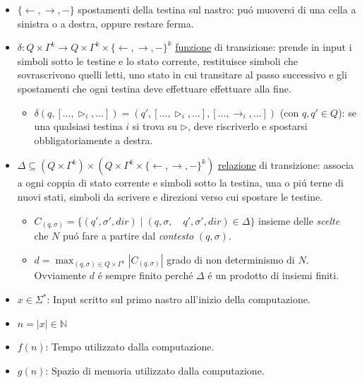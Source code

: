 \begin{itemize}
    \item $\{\leftarrow, \rightarrow, -\}$ spostamenti della testina sul nastro: puó muoversi di una cella a sinistra o a destra, oppure restare ferma.
    \item $\delta: Q \times \Gamma^k \rightarrow Q \times \Gamma^k \times \{\leftarrow, \rightarrow, -\}^k$ \underline{funzione} di transizione: prende in input i simboli sotto le testine e lo stato corrente, restituisce simboli che sovrascrivono quelli letti, uno stato in cui transitare al passo successivo e gli spostamenti che ogni testina deve effettuare effettuare alla fine.
    \begin{itemize}
        \item $\delta(q, [\dots, \triangleright_i, \dots]) = (q', [\dots, \triangleright_i, \dots], [\dots, \rightarrow_i, \dots])$ (con $q, q' \in Q$): se una qualsiasi testina $i$ si trova su $\triangleright$, deve riscriverlo e spostarsi obbligatoriamente a destra.
    \end{itemize}
    \item $\Delta \subseteq (Q \times \Gamma^k) \times (Q \times \Gamma^k \times \{\leftarrow, \rightarrow, -\}^k)$ \underline{relazione} di transizione: associa a ogni coppia di stato corrente e simboli sotto la testina, una o piú terne di nuovi stati, simboli da scrivere e direzioni verso cui spostare le testine.
    \begin{itemize} 
        \item $C_{(q,\sigma)} = \{(q', \sigma', \textit{dir}) \mid (q, \sigma, \quad q', \sigma', \textit{dir}) \in \Delta\}$ insieme delle \textit{scelte} che $N$ puó fare a partire dal \textit{contesto} $(q, \sigma)$.
        \item $d = \max_{(q, \sigma) \in Q \times \Gamma^k} |C_{(q,\sigma)}|$ grado di non determinismo di $N$.
        \subitem Ovviamente $d$ é sempre finito perché $\Delta$ é un prodotto di insiemi finiti.
    \end{itemize}
\end{itemize}

\hrulefill

\begin{itemize}
    \item $x \in \Sigma^*$: Input scritto sul primo nastro all'inizio della computazione.
    \item $n = |x| \in \mathbb{N}$
    \item $f(n)$: Tempo utilizzato dalla computazione.
    \item $g(n)$: Spazio di memoria utilizzato dalla computazione.
\end{itemize}


